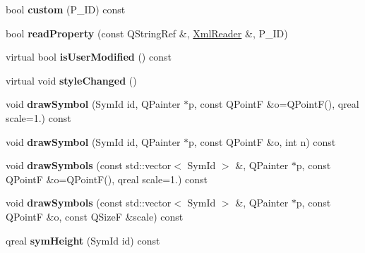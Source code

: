 \begin{DoxyCompactItemize}
\item 
\mbox{\label{class_ms_1_1_element_a3396b960b9454ded75569952e2974daa}} 
bool {\bfseries custom} (P\+\_\+\+ID) const
\item 
\mbox{\label{class_ms_1_1_element_a81615eec9cf2b7debc8d9a4755bcbd89}} 
bool {\bfseries read\+Property} (const Q\+String\+Ref \&, \hyperlink{class_ms_1_1_xml_reader}{Xml\+Reader} \&, P\+\_\+\+ID)
\item 
\mbox{\label{class_ms_1_1_element_aa8c81e3444c2166a739fb31ca1bffe4e}} 
virtual bool {\bfseries is\+User\+Modified} () const
\item 
\mbox{\label{class_ms_1_1_element_a96c611797736aa826470b03e254aa47c}} 
virtual void {\bfseries style\+Changed} ()
\item 
\mbox{\label{class_ms_1_1_element_a19be3f786fea6071a0043666dfed093c}} 
void {\bfseries draw\+Symbol} (Sym\+Id id, Q\+Painter $\ast$p, const Q\+PointF \&o=Q\+PointF(), qreal scale=1.) const
\item 
\mbox{\label{class_ms_1_1_element_ab46d5de09232cb2f8d3e52de5042eff1}} 
void {\bfseries draw\+Symbol} (Sym\+Id id, Q\+Painter $\ast$p, const Q\+PointF \&o, int n) const
\item 
\mbox{\label{class_ms_1_1_element_a99b748b700ce85d3507a51d5221191f4}} 
void {\bfseries draw\+Symbols} (const std\+::vector$<$ Sym\+Id $>$ \&, Q\+Painter $\ast$p, const Q\+PointF \&o=Q\+PointF(), qreal scale=1.) const
\item 
\mbox{\label{class_ms_1_1_element_aae2c7e7cfc90cf5e4d34573599c4cfe9}} 
void {\bfseries draw\+Symbols} (const std\+::vector$<$ Sym\+Id $>$ \&, Q\+Painter $\ast$p, const Q\+PointF \&o, const Q\+SizeF \&scale) const
\item 
\mbox{\label{class_ms_1_1_element_ab3254b043c87dd338bfa6630c93e8e26}} 
qreal {\bfseries sym\+Height} (Sym\+Id id) const
\item 
\mbox{\label{class_ms_1_1_element_adc45b084165da6ceb3afa7913d6a3feb}} 

\end{DoxyCompactItemize}

